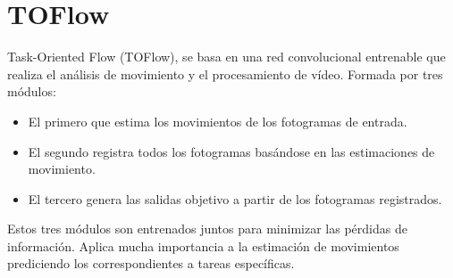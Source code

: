 \section{TOFlow}
Task-Oriented Flow (TOFlow)\cite{xue2019video}, se basa en una red convolucional entrenable que realiza el análisis de movimiento y el procesamiento de vídeo. Formada por tres módulos:

\begin{itemize}
\item El primero que estima los movimientos de los fotogramas de entrada. 

\item El segundo registra todos los fotogramas basándose en las estimaciones de movimiento. 

\item El tercero genera las salidas objetivo a partir de los fotogramas registrados.

\end{itemize}

Estos tres módulos son entrenados juntos para minimizar las pérdidas de información. Aplica mucha importancia a la estimación de movimientos prediciendo los correspondientes a tareas específicas.
